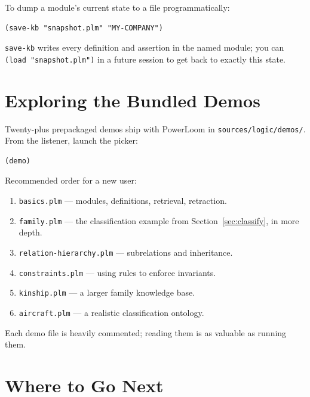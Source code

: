\documentclass[11pt,letterpaper]{article}
\newcommand{\cmd}[1]{\texttt{#1}}
\newcommand{\file}[1]{\texttt{#1}}
\begin{document}
\noindent To dump a module's current state to a file programmatically:

\begin{lstlisting}
(save-kb "snapshot.plm" "MY-COMPANY")
\end{lstlisting}

\noindent \cmd{save-kb} writes every definition and assertion in the named
module; you can \cmd{(load "snapshot.plm")} in a future session to get
back to exactly this state.

\section{Exploring the Bundled Demos}
\label{sec:demos}

Twenty-plus prepackaged demos ship with PowerLoom in
\file{sources/logic/demos/}. From the listener, launch the picker:

\begin{lstlisting}
(demo)
\end{lstlisting}

\noindent Recommended order for a new user:

\begin{enumerate}[nosep]
  \item \file{basics.plm} --- modules, definitions, retrieval, retraction.
  \item \file{family.plm} --- the classification example from
        Section~\ref{sec:classify}, in more depth.
  \item \file{relation-hierarchy.plm} --- subrelations and inheritance.
  \item \file{constraints.plm} --- using rules to enforce invariants.
  \item \file{kinship.plm} --- a larger family knowledge base.
  \item \file{aircraft.plm} --- a realistic classification ontology.
\end{enumerate}

\noindent Each demo file is heavily commented; reading them is as valuable
as running them.

\section{Where to Go Next}
\label{sec:next}
\end{document}
